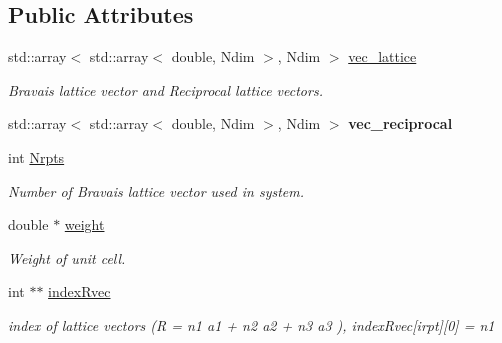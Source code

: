 \subsection*{Public Attributes}
\begin{DoxyCompactItemize}
\item 
\mbox{\label{class_tight_binding_a6be74f2d16bf604fbbe4f8a430dd7d55}} 
std\+::array$<$ std\+::array$<$ double, Ndim $>$, Ndim $>$ \hyperlink{class_tight_binding_a6be74f2d16bf604fbbe4f8a430dd7d55}{vec\+\_\+lattice}
\begin{DoxyCompactList}\small\item\em Bravais lattice vector and Reciprocal lattice vectors. \end{DoxyCompactList}\item 
\mbox{\label{class_tight_binding_a8d1e54ade0e3fa577dc8c1328ec05851}} 
std\+::array$<$ std\+::array$<$ double, Ndim $>$, Ndim $>$ {\bfseries vec\+\_\+reciprocal}
\item 
\mbox{\label{class_tight_binding_a19258a99dd6a1790aca58ec9338626a4}} 
int \hyperlink{class_tight_binding_a19258a99dd6a1790aca58ec9338626a4}{Nrpts}
\begin{DoxyCompactList}\small\item\em Number of Bravais lattice vector used in system. \end{DoxyCompactList}\item 
\mbox{\label{class_tight_binding_ad570545ed28e5ab8132bb392bbee99c4}} 
double $\ast$ \hyperlink{class_tight_binding_ad570545ed28e5ab8132bb392bbee99c4}{weight}
\begin{DoxyCompactList}\small\item\em Weight of unit cell. \end{DoxyCompactList}\item 
\mbox{\label{class_tight_binding_a7c5965d0460f81a924c6609037bdbf7e}} 
int $\ast$$\ast$ \hyperlink{class_tight_binding_a7c5965d0460f81a924c6609037bdbf7e}{index\+Rvec}
\begin{DoxyCompactList}\small\item\em index of lattice vectors (R = n1 a1 + n2 a2 + n3 a3 ), index\+Rvec\mbox{[}irpt\mbox{]}\mbox{[}0\mbox{]} = n1 \end{DoxyCompactList}\item 
$$
\end{DoxyCompactItemize}
